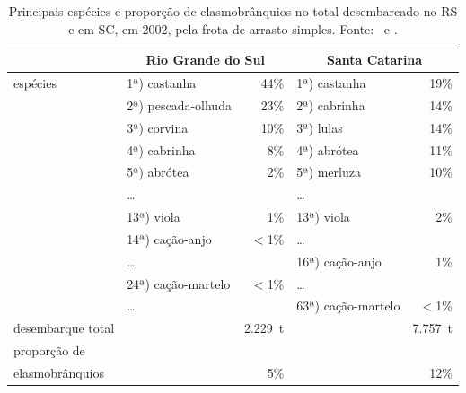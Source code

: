 \documentclass[a4paper,11pt,twoside,showtrims,onecolumn,openright,final]{memoir}
\begin{document}
\begin{table}
\caption[Principais espécies e proporção de elasmobrânquios no total desembarcado no RS e em SC, em 2002,
	 pela frota de arrasto simples.]
	{Principais espécies e proporção de elasmobrânquios no total desembarcado no RS e em SC, em 2002,
	 pela frota de arrasto simples. Fonte: \citet{ceperg2003}\ e \citet{univali2003}.}
\label{tab:capturas-arrastosimples}
\begin{center}
\begin{tabular*}{\textwidth}{l@{\extracolsep{\fill}}lrlr}
\toprule
		& \multicolumn{2}{c}{Rio Grande do Sul} & \multicolumn{2}{c}{Santa Catarina} \\
\midrule
espécies	& 1ª) castanha		& 44\%	& 1ª) castanha		  & 19\%	\\
		& 2ª) pescada-olhuda	& 23\%	& 2ª) cabrinha 		  & 14\%	\\
		& 3ª) corvina		& 10\%	& 3ª) lulas 		  & 14\%	\\
		& 4ª) cabrinha		& 8\%	& 4ª) abrótea 		  & 11\%	\\
		& 5ª) abrótea		& 2\%	& 5ª) merluza 		  & 10\%	\\
		& \ldots 		&	& \ldots 		  &		\\
		& 13ª) viola		& 1\%	& 13ª) viola	  	  & 2\%		\\
		& 14ª) cação-anjo	& $<$1\%& \ldots	  	  & 		\\
		& \ldots 		&	& 16ª) cação-anjo 	  & 1\%		\\
		& 24ª) cação-martelo	& $<$1\%& \ldots	  	  & 		\\
		& \ldots 		&	& 63ª) cação-martelo	  & $<$1\%	\\
\midrule
desembarque total & 			& 2.229~t & 			  & 7.757~t	\\
\midrule
proporção de	& 			&	& 			  & 		\\
elasmobrânquios	& 			& 5\%	& 			  & 12\%	\\
\bottomrule
\end{tabular*}
\end{center}
\end{table}


\end{document}
